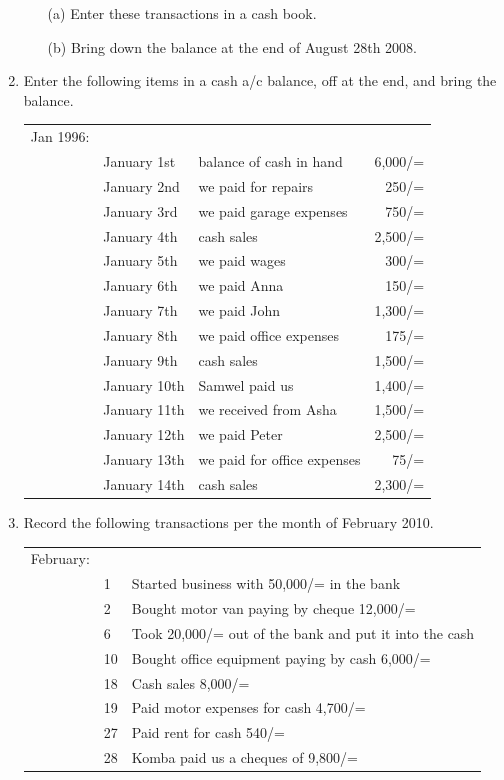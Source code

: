 \begin{enumerate}
\begin{itemize}
\item[(a)] Enter these transactions in a cash book.
\item[(b)] Bring down the balance at the end of August 28th 2008.
\end{itemize}




\item Enter the following items in a cash a\slash c balance, off at the end, and bring the balance.\\

\begin{tabular}{l l p{4cm} r}
Jan 1996:&  & & \\
& January 1st & balance of cash in hand & 6,000/=\\
& January 2nd & we paid for repairs & 250/=\\
& January 3rd & we paid garage expenses & 750/=\\
& January 4th & cash sales & 2,500/=\\
& January 5th & we paid wages & 300/=\\
& January 6th & we paid Anna & 150/=\\
& January 7th & we paid John & 1,300/=\\
& January 8th & we paid office expenses & 175/=\\
& January 9th & cash sales & 1,500/=\\
& January 10th & Samwel paid us & 1,400/=\\
& January 11th & we received from Asha & 1,500/=\\
& January 12th & we paid Peter & 2,500/=\\
& January 13th & we paid for office expenses & 75/=\\
& January 14th & cash sales & 2,300/=
\end{tabular}



\item Record the following transactions per the month of February 2010.\\

\begin{tabular}{lll}
February: & &\\
& 1 & Started business with 50,000/= in the bank\\
& 2 & Bought motor van paying by cheque 12,000/=\\
& 6 & Took 20,000/= out of the bank and put it into the cash\\
& 10 & Bought office equipment paying by cash 6,000/=\\
& 18 & Cash sales 8,000/=\\
& 19 & Paid motor expenses for cash 4,700/=\\
& 27 & Paid rent for cash 540/=\\
& 28 & Komba paid us a cheques of 9,800/=\\
\end{tabular}


\end{enumerate}


